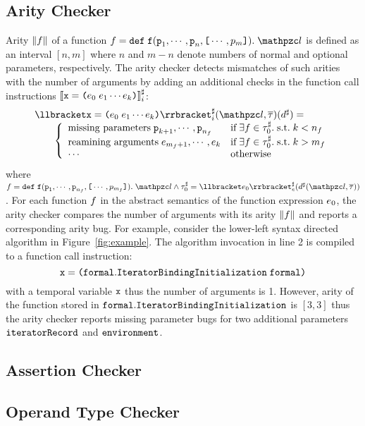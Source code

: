 \subsection{Arity Checker}
Arity $\lVert{f}\rVert$ of a function $\func = \kwdef \; \f (\p_1, \cdots, \p_n,
\kwsl \cdots, p_m \kwsr). \; \lab$ is defined as an interval $[n, m]$ where $n$
and $m-n$ denote numbers of normal and optional parameters, respectively.  The
arity checker detects mismatches of such arities with the number of arguments by
adding an additional checks in the function call instructions ${\llbracket{\texttt{x}= \texttt{(}e_0 \; e_1 \cdots e_k \texttt{)}}\rrbracket}^\sharp_i$:
\[
  \begin{array}{l}
    \asemi{\x = \kwrl \expr_0 \; \expr_1 \cdots \expr_k \kwrr}(\lab,
    \tys)(\aelem) =\\
    \qquad \left\{
      \begin{array}{ll}
        \text{missing parameters} \; \p_{k+1}, \cdots, \p_{n_\func} &
        \text{if} \; \exists \func \in \aty_0. \; \text{s.t.} \; k < n_\func\\

        \text{reamining arguments} \; \expr_{m_\func+1}, \cdots, \expr_k &
        \text{if} \; \exists \func \in \aty_0. \; \text{s.t.} \; k > m_\func\\

        \cdots &
        \text{otherwise}\\
      \end{array}
    \right.\\
  \end{array}
\]
where $\func = \kwdef \; \f (\p_1, \cdots, \p_{n_\func}, \kwsl \cdots,
p_{m_\func} \kwsr). \; \lab \wedge \aty_0 = \aseme{\expr_0}(\aelem(\lab,
\tys))$.  For each function $f$ in the abstract semantics of the function
expression $e_0$, the arity checker compares the number of arguments with
its arity $\lVert{f}\rVert$ and reports a corresponding arity bug.  For example,
consider the lower-left syntax directed algorithm in Figure~\ref{fig:example}.
The algorithm invocation in line 2 is compiled to a function call instruction:
\[
  \texttt{x} = \texttt{(} \texttt{formal}.\texttt{IteratorBindingInitialization} \; \texttt{formal}
  \texttt{)}
\]
with a temporal variable $\texttt{x}$ thus the number of arguments is 1.  However, arity
of the function stored in $\texttt{formal}.\texttt{IteratorBindingInitialization}$
is $[3, 3]$ thus the arity checker reports missing parameter bugs for two
additional parameters $\texttt{iteratorRecord}$ and $\texttt{environment}$.

\subsection{Assertion Checker}
\todo


\subsection{Operand Type Checker}
\todo


